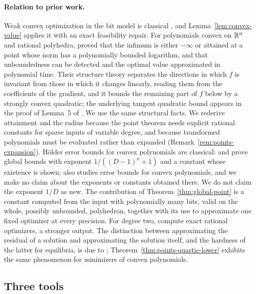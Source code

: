 \paragraph{Relation to prior work.}
Weak convex optimization in the bit model is classical
\citep{GroetschelLovaszSchrijver1988}, and Lemma~\ref{lem:convex-value}
applies it with an exact feasibility repair. For polynomials convex on
$\mathbb R^n$ and rational polyhedra, \citet[Theorem~1.1 and
Corollary~1.2]{SlotSteurerWiedmer2025} proved that the infimum is either
$-\infty$ or attained at a point whose norm has a polynomially bounded
logarithm, and that unboundedness can be detected and the optimal value
approximated in polynomial time. Their structure theory separates the directions in
which $f$ is invariant from those in which it changes linearly, reading
them from the coefficients of the gradient, and it bounds the remaining
part of $f$ below by a strongly convex quadratic; the underlying tangent
quadratic bound appears in the proof of Lemma~5 of
\citet{AhmadiChaudhryZhang2024}. We use the same structural facts. We
rederive attainment and the radius because the point theorem needs explicit
rational constants for sparse inputs of variable degree, and because
transformed polynomials must be evaluated rather than expanded
(Remark~\ref{rem:points-expansion}). H\"older error bounds for convex
polynomials are classical: \citet[Theorem~4.2 and Corollary~4.1]{Li2010}
and \citet[Theorem~1]{Li2013} prove global bounds with exponent
$1/((D-1)^n+1)$ and a constant whose existence is shown;
\citet{Yang2009} also studies error bounds for convex polynomials, and we
make no claim about the exponents or constants obtained there. We do not
claim the exponent $1/D$ as new. The contribution of
Theorem~\ref{thm:global-point} is a constant computed from the input with
polynomially many bits, valid on the whole, possibly unbounded,
polyhedron, together with its use to approximate one fixed optimizer at
every precision. For degree two, \citet{KozlovTarasovKhachiyan1980} compute
exact rational optimizers, a stronger output. The distinction between
approximating the residual of a solution and approximating the solution
itself, and the hardness of the latter for equilibria, is due to
\citet{EY2010}; Theorem~\ref{thm:points-quartic-lower} exhibits the same
phenomenon for minimizers of convex polynomials.

\subsection{Three tools}\label{sec:points-tools}

